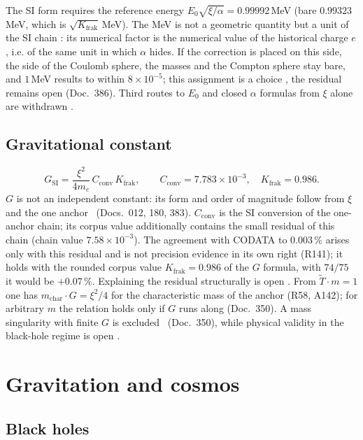 The SI form requires the reference energy
$E_0\sqrt{\xi/\alpha}=0.99992$\,MeV (bare $0.99323$\,MeV, which is $\sqrt{K_{\text{frak}}}$\,MeV).
The MeV is not a geometric quantity but a unit of the SI chain \QM: its numerical factor is the
numerical value of the historical charge $e$, i.e. of the same unit in which $\alpha$ hides. If the
correction is placed on this side, the side of the Coulomb sphere, the masses and the Compton
sphere stay bare, and $1$\,MeV results to within $8\times10^{-5}$; this assignment is a choice
\SM, the residual remains open (Doc.~386). Third routes to
$E_0$ and closed $\alpha$ formulas from $\xi$ alone are withdrawn \XM.

\subsection{Gravitational constant}

\begin{equation}
  G_{\text{SI}}=\frac{\xi^2}{4m_e}\,C_{\text{conv}}\,K_{\text{frak}},\qquad
  C_{\text{conv}}=7.783\times10^{-3},\quad K_{\text{frak}}=0.986 .
\end{equation}
$G$ is not an independent constant: its form and order of magnitude follow from $\xi$ and the one
anchor \KM\ (Docs.~012, 180, 383). $C_{\text{conv}}$ is the SI conversion of the one-anchor
chain; its corpus value additionally contains the small residual of this chain (chain value
$7.58\times10^{-3}$). The agreement with CODATA to $0.003\,\%$ arises only with this residual and
is not precision evidence in its own right (R141); it holds with the rounded corpus value
$K_{\text{frak}}=0.986$ of the $G$ formula, with $74/75$ it would be $+0.07\,\%$. Explaining the
residual structurally is open \SM. From $\tilde T\cdot m=1$ one has $m_{\text{char}}\cdot G=\xi^2/4$ for the
characteristic mass of the anchor (R58, A142); for arbitrary $m$ the relation holds only if $G$ runs
along (Doc.~350). A mass singularity with finite $G$ is excluded \BM\ (Doc.~350), while physical validity in the
black-hole regime is open \SM.

\section{Gravitation and cosmos}

\subsection{Black holes}

